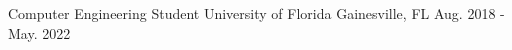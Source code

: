 \begin{cventries}
  \cvshortentry
    {Computer Engineering Student}
    {University of Florida}
    {Gainesville, FL}
    {Aug. 2018 - May. 2022}
\end{cventries}
